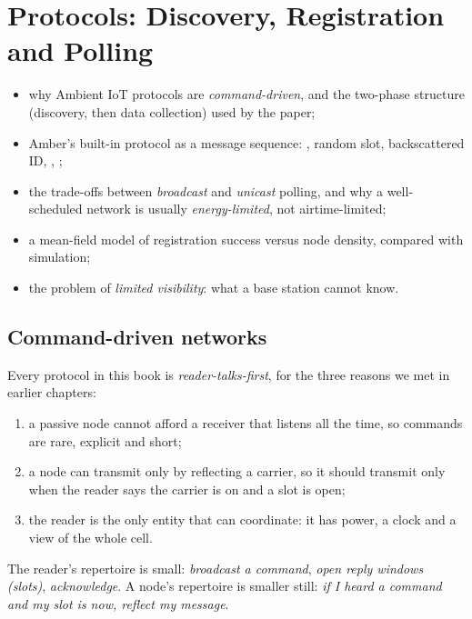 \chapter{Protocols: Discovery, Registration and Polling}
\label{ch:protocols}

\begin{defbox}
\begin{itemize}
 \item why Ambient IoT protocols are \emph{command-driven}, and the two-phase structure (discovery, then data collection) used by the paper;
 \item Amber's built-in protocol as a message sequence: , random slot, backscattered ID, , ;
 \item the trade-offs between \emph{broadcast} and \emph{unicast} polling, and why a well-scheduled network is usually \emph{energy-limited}, not airtime-limited;
 \item a mean-field model of registration success versus node density, compared with simulation;
 \item the problem of \emph{limited visibility}: what a base station cannot know.
\end{itemize}
\end{defbox}

\section{Command-driven networks}
\label{sec:cmddriven}

Every protocol in this book is \emph{reader-talks-first}, for the three reasons we met in earlier chapters:
\begin{enumerate}
 \item a passive node cannot afford a receiver that listens all the time, so commands are rare, explicit and short;
 \item a node can transmit only by reflecting a carrier, so it should transmit only when the reader says the carrier is on and a slot is open;
 \item the reader is the only entity that can coordinate: it has power, a clock and a view of the whole cell.
\end{enumerate}
The reader's repertoire is small: \emph{broadcast a command}, \emph{open reply windows (slots)}, \emph{acknowledge}. A node's repertoire is smaller still: \emph{if I heard a command and my slot is now, reflect my message}.

